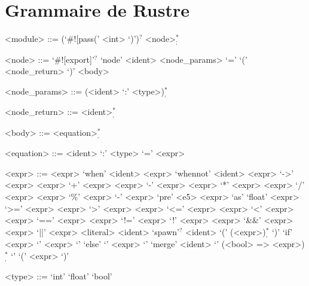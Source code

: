 \documentclass{scrartcl}
\begin{document}
\section{Grammaire de Rustre}
\begin{grammar}
  <module> ::= (`#![pass(' <int> `)')${}^?$ <node>${}^*_;$

  <node> ::= `#![export]'${}^?$ `node' <ident> <node\_params> `=' `(' <node\_return> `)' <body>

  <node\_params> ::= (<ident> `:' <type>)${}^*_,$

  <node\_return> ::= <ident>${}^*_,$

  <body> ::= <equation>${}^*_,$

  <equation> ::= <ident> `:' <type> `=' <expr>

  <expr> ::= <expr> `when' <ident>
  \alt <expr> `whennot' <ident>
  \alt <expr> `->' <expr>
  \alt <expr> `+' <expr>
  \alt <expr> `-' <expr>
  \alt <expr> `*' <expr>
  \alt <expr> `/' <expr>
  \alt <expr> `\%' <expr>
  \alt `-' <expr>
  \alt `pre' <e5>
  \alt <expr> `as' `float'
  \alt <expr> `>=' <expr>
  \alt <expr> `>' <expr>
  \alt <expr> `<=' <expr>
  \alt <expr> `<' <expr>
  \alt <expr> `==' <expr>
  \alt <expr> `!=' <expr>
  \alt `!' <expr>
  \alt <expr> `&&' <expr>
  \alt <expr> `||' <expr>
  \alt <literal>
  \alt <ident>
  \alt `spawn'$^?$ <ident> `(' (<expr>)${}^*_,$ `)'
  \alt `if' <expr> `{' <expr> `}' `else' `{' <expr> `}'
  \alt `merge' <ident> `{' (<bool> => <expr>)${}^*_,$ `}'
  \alt `(' <expr> `)'

  <type> ::= `int'
  \alt `float'
  \alt `bool'
\end{grammar}
\end{document}
